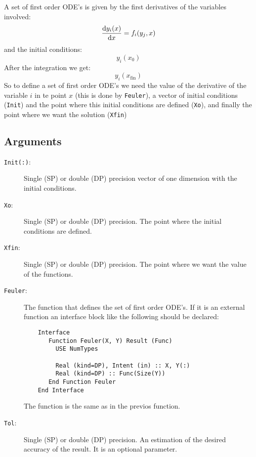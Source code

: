 A set of first order ODE's is given by the first derivatives of the
variables involved:
\begin{displaymath}
  \frac{\mathrm{d} y_i(x)}{\mathrm{d} x} = f_i(y_j, x)
\end{displaymath}
and the initial conditions:
\begin{displaymath}
  y_i(x_0)
\end{displaymath}
After the integration we get:
\begin{displaymath}
  y_i(x_{\text{fin}})
\end{displaymath}
So to define a set of first order ODE's we need the value of the
derivative of the variable $i$ in te point $x$ (this is done by
\texttt{Feuler}), a vector of initial conditions (\texttt{Init}) and
the point where this initial conditions are defined (\texttt{Xo}), and
finally the point where we want the solution (\texttt{Xfin})

\subsection{Arguments}

\begin{description}
\item[\texttt{Init(:)}:] Single (SP) or double (DP) precision vector of
  one dimension with the initial conditions.
\item[\texttt{Xo}:] Single (SP) or double (DP) precision. The point
  where the initial conditions are defined.
\item[\texttt{Xfin}:] Single (SP) or double (DP) precision. The point
  where we want the value of the functions.
\item[\texttt{Feuler}:] The function that defines the set of first order
  ODE's. If it is an external function an interface block like the
  following should be declared: 
\begin{verbatim}
    Interface
       Function Feuler(X, Y) Result (Func)
         USE NumTypes

         Real (kind=DP), Intent (in) :: X, Y(:)
         Real (kind=DP) :: Func(Size(Y))
       End Function Feuler
    End Interface
\end{verbatim}
The function is the same as in the previos function.
\item[\texttt{Tol}:] Single (SP) or double (DP) precision. An
  estimation of the desired accuracy of the result. It is an optional
  parameter.
\end{description}

